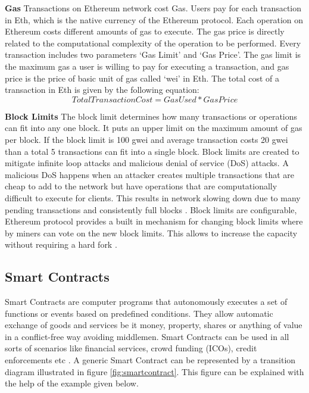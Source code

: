 \textbf{Gas}
Transactions on Ethereum network cost Gas. Users pay for each transaction in Eth, which is the native currency of the Ethereum protocol. Each operation on Ethereum costs different amounts of gas to execute. The gas price is directly related to the computational complexity of the operation to be performed. Every transaction includes two parameters ‘Gas Limit’ and ‘Gas Price’.  The gas limit is the maximum gas a user is willing to pay for executing a transaction, and gas price is the price of basic unit of gas called ‘wei’ in Eth. The total cost of a transaction in Eth is given by the following equation: \cite{eth:001}
\[ Total Transaction Cost = GasUsed * GasPrice \]

\textbf{Block Limits}
The block limit determines how many transactions or operations can fit into any one block. It puts an upper limit on the maximum amount of gas per block. If the block limit is 100 gwei and average transaction costs 20 gwei than a total 5 transactions can fit into a single block. Block limits are created to mitigate infinite loop attacks and malicious denial of service (DoS) attacks. A malicious DoS happens when an attacker creates multiple transactions that are cheap to add to the network but have operations that are computationally difficult to execute for clients. This results in network slowing down due to many pending transactions and consistently full blocks \cite{misc:026}. Block limits are configurable, Ethereum protocol provides a built in mechanism for changing block limits where by miners can vote on the new block limits. This allows to increase the capacity without requiring a hard fork \cite{eth:001}.
 
\clearpage
\subsection{Smart Contracts}
Smart Contracts are computer programs that autonomously executes a set of functions or events based on predefined conditions. They allow automatic exchange of goods and services be it money, property, shares or anything of value in a conflict-free way avoiding middlemen. Smart Contracts can be used in all sorts of scenarios like financial services, crowd funding (ICOs), credit enforcements etc \cite{paper:009}. A generic Smart Contract can be represented by a transition diagram illustrated in figure \ref{fig:smartcontract}. This figure can be explained with the help of the example given below.
 
